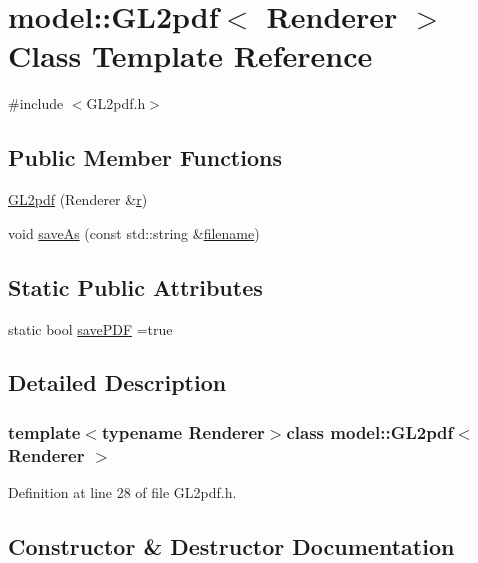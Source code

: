 \hypertarget{classmodel_1_1_g_l2pdf}{}\section{model\+:\+:G\+L2pdf$<$ Renderer $>$ Class Template Reference}
\label{classmodel_1_1_g_l2pdf}


{\ttfamily \#include $<$G\+L2pdf.\+h$>$}

\subsection*{Public Member Functions}
\begin{DoxyCompactItemize}
\item 
\hyperlink{classmodel_1_1_g_l2pdf_aff36eb4b9828f731e7d6f7895a12db98}{G\+L2pdf} (Renderer \&\hyperlink{_f_e_m_2linear__elasticity__3d_2tetgen_2generate_p_o_l_ycube_8m_a1e0e2eb903c69285388440da0f0c63d0}{r})
\item 
void \hyperlink{classmodel_1_1_g_l2pdf_a7ea549790583ffad03c6ecbe6d883422}{save\+As} (const std\+::string \&\hyperlink{_f_e_m_2linear__elasticity__3d_2tetgen_2generate_p_o_l_ycube_8m_a221163590ee33005cb379c7bec93f1ec}{filename})
\end{DoxyCompactItemize}
\subsection*{Static Public Attributes}
\begin{DoxyCompactItemize}
\item 
static bool \hyperlink{classmodel_1_1_g_l2pdf_ad6a0d7ef67681b120e7f91fa70459276}{save\+P\+D\+F} =true
\end{DoxyCompactItemize}


\subsection{Detailed Description}
\subsubsection*{template$<$typename Renderer$>$class model\+::\+G\+L2pdf$<$ Renderer $>$}



Definition at line 28 of file G\+L2pdf.\+h.



\subsection{Constructor \& Destructor Documentation}
\hypertarget{classmodel_1_1_g_l2pdf_aff36eb4b9828f731e7d6f7895a12db98}{}
